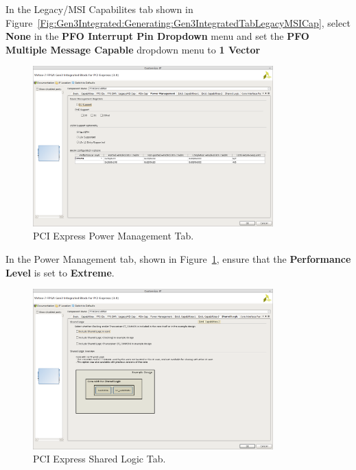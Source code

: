 \documentclass{refrep}
\newcommand{\ConfigSetting}[1]{\textbf{#1}}
\begin{document}
In the Legacy/MSI Capabilites tab shown in
Figure~\ref{Fig:Gen3Integrated:Generating:Gen3IntegratedTabLegacyMSICap}, select
\ConfigSetting{None} in the \ConfigSetting{PFO Interrupt Pin Dropdown} menu and
set the \ConfigSetting{PFO Multiple Message Capable} dropdown menu to
\ConfigSetting{1 Vector}
\begin{figure}[H]
  \includegraphics[width=350px,center]{Gen3IntegratedTabPowerManagement.png}
  \caption{PCI Express Power Management Tab.}
  \label{Fig:Gen3Integrated:Generating:Gen3IntegratedTabPowerManagement}
\end{figure}
In the Power Management tab, shown in
Figure~\ref{Fig:Gen3Integrated:Generating:Gen3IntegratedTabPowerManagement},
ensure that the \ConfigSetting{Performance Level} is set to
\ConfigSetting{Extreme}.
\begin{figure}[H]
  \includegraphics[width=350px,center]{Gen3IntegratedTabSharedLogic.png}
  \caption{PCI Express Shared Logic Tab.}
  \label{Fig:Gen3Integrated:Generating:Gen3IntegratedTabSharedLogic}
\end{figure}
\end{document}
